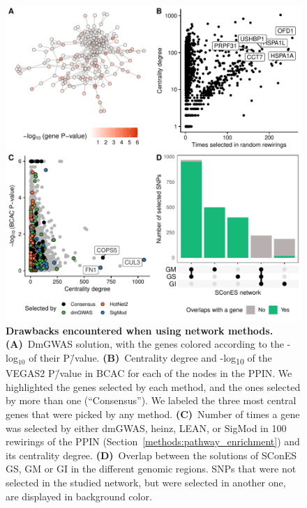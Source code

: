 \documentclass[10pt,letterpaper]{article}
\begin{document}
\begin{figure}[!ht]
  \centering
  \includegraphics[width=\linewidth]{./figures/figure_2.pdf}
  \caption{{\bf Drawbacks encountered when using network methods.} \textbf{(A)}~DmGWAS solution, with the genes colored according to the -log$_{10}$ of their P\=/value. \textbf{(B)}~Centrality degree and -log\textsubscript{10} of the VEGAS2 P\=/value in BCAC for each of the nodes in the PPIN. We highlighted the genes selected by each method, and the ones selected by more than one (``Consensus''). We labeled the three most central genes that were picked by any method. \textbf{(C)}~Number of times a gene was selected by either dmGWAS, heinz, LEAN, or SigMod in 100 rewirings of the PPIN (Section~\ref{methods:pathway_enrichment}) and its centrality degree. \textbf{(D)}~Overlap between the solutions of SConES GS, GM or GI in the different genomic regions. SNPs that were not selected in the studied network, but were selected in another one, are displayed in background color. }
  \label{fig:issues}
  \end{figure}
\end{document}
